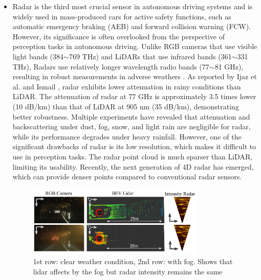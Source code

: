 \documentclass[rnd]{mas_proposal}
\begin{document}
\begin{itemize}
      \item Radar is the third most crucial sensor in autonomous driving systems and is widely used in mass-produced cars for active safety functions, such as automatic emergency braking (AEB) and forward collision warning (FCW). However, its significance is often overlooked from the perspective of perception tasks in autonomous driving. Unlike RGB cameras that use visible light bands (384$\sim$769 THz) and LiDARs that use infrared bands (361$\sim$331 THz), Radars use relatively longer wavelength radio bands (77$\sim$81 GHz), resulting in robust measurements in adverse weathers \cite{Paek2022Jun}. As reported by Ijaz et al. \cite{ijaz2012analysis} and Ismail \cite{gultepe2008measurements}, radar exhibits lower attenuation in rainy conditions than LiDAR. The attenuation of radar at 77 GHz is approximately 3.5 times lower (10 dB/km) than that of LiDAR at 905 nm (35 dB/km), demonstrating better robustness. Multiple experiments \cite{adams2012robotic, brooker2007seeing, xu2022learned, gourova2017analysis, zang2019impact} have revealed that attenuation and backscattering under dust, fog, snow, and light rain are negligible for radar, while its performance degrades under heavy rainfall. However, one of the significant drawbacks of radar is its low resolution, which makes it difficult to use in perception tasks. The radar point cloud is much sparser than LiDAR, limiting its usability. Recently, the next generation of 4D radar has emerged, which can provide denser points compared to conventional radar sensors.
            \begin{figure}[h]
                  \centering
                  \includegraphics[width=0.8\textwidth]{images/lidar_in_fog.png}
                  \caption{\centering 1st row: clear weather condition, 2nd row: with fog. Shows that lidar affects by the fog but radar intensity remains the same \cite{bijelic2020seeing}}
                  \label{fig:lidar_in_fog}
            \end{figure}


\end{itemize}
\end{document}
